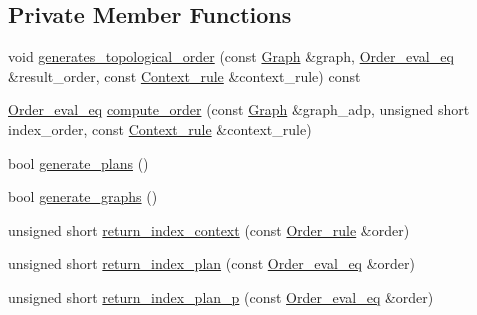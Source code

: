 \subsection*{Private Member Functions}
\begin{DoxyCompactItemize}
\item 
void \hyperlink{classgenevalmag_1_1Builder__plans_a9293c2318f2a323616fc49505a44e4e3}{generates\_\-topological\_\-order} (const \hyperlink{namespacegenevalmag_a4a96de9ebfc7d48233406ab9cad55cb5}{Graph} \&graph, \hyperlink{namespacegenevalmag_a0bb2e8b0fa1b07b873f0363719de7b64}{Order\_\-eval\_\-eq} \&result\_\-order, const \hyperlink{structgenevalmag_1_1c__rule}{Context\_\-rule} \&context\_\-rule) const 
\item 
\hyperlink{namespacegenevalmag_a0bb2e8b0fa1b07b873f0363719de7b64}{Order\_\-eval\_\-eq} \hyperlink{classgenevalmag_1_1Builder__plans_a86e05ee91d27e62d16d77ecbdec05bf7}{compute\_\-order} (const \hyperlink{namespacegenevalmag_a4a96de9ebfc7d48233406ab9cad55cb5}{Graph} \&graph\_\-adp, unsigned short index\_\-order, const \hyperlink{structgenevalmag_1_1c__rule}{Context\_\-rule} \&context\_\-rule)
\item 
bool \hyperlink{classgenevalmag_1_1Builder__plans_a5002819447c17a1f81c197da66bd3e56}{generate\_\-plans} ()
\item 
bool \hyperlink{classgenevalmag_1_1Builder__plans_a9552dcef13af0de0f3f2ff59a330d15c}{generate\_\-graphs} ()
\item 
unsigned short \hyperlink{classgenevalmag_1_1Builder__plans_ae44e39bd410967f7f882100b33fb3405}{return\_\-index\_\-context} (const \hyperlink{namespacegenevalmag_aed20da32fb9692645ae53d911d274fd5}{Order\_\-rule} \&order)
\item 
unsigned short \hyperlink{classgenevalmag_1_1Builder__plans_a0a0fba0d3630f02c280f9d3997c6bd80}{return\_\-index\_\-plan} (const \hyperlink{namespacegenevalmag_a0bb2e8b0fa1b07b873f0363719de7b64}{Order\_\-eval\_\-eq} \&order)
\item 
unsigned short \hyperlink{classgenevalmag_1_1Builder__plans_a08c73ceb7e4bbd71732cac943ccfbaa9}{return\_\-index\_\-plan\_\-p} (const \hyperlink{namespacegenevalmag_a0bb2e8b0fa1b07b873f0363719de7b64}{Order\_\-eval\_\-eq} \&order)
\end{DoxyCompactItemize}
